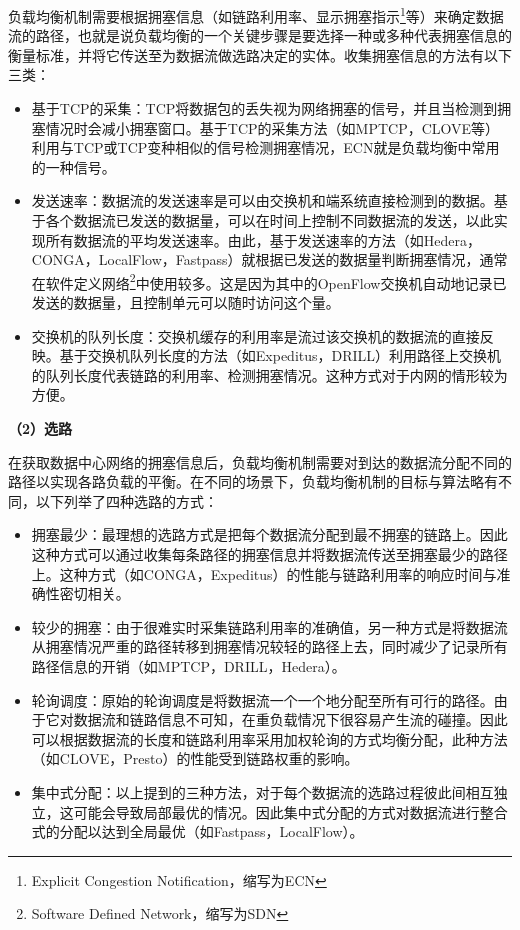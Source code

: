负载均衡机制需要根据拥塞信息（如链路利用率、显示拥塞指示\footnote{Explicit Congestion Notification，缩写为ECN}等）来确定数据流的路径，也就是说负载均衡的一个关键步骤是要选择一种或多种代表拥塞信息的衡量标准，并将它传送至为数据流做选路决定的实体。收集拥塞信息的方法有以下三类：
\begin{itemize}
    \item 基于TCP的采集：TCP将数据包的丢失视为网络拥塞的信号，并且当检测到拥塞情况时会减小拥塞窗口。基于TCP的采集方法（如MPTCP\cite{raiciu2011MPTCP}，CLOVE\cite{katta2016CLOVE}等）利用与TCP或TCP变种相似的信号检测拥塞情况，ECN就是负载均衡中常用的一种信号。
    \item 发送速率：数据流的发送速率是可以由交换机和端系统直接检测到的数据。基于各个数据流已发送的数据量，可以在时间上控制不同数据流的发送，以此实现所有数据流的平均发送速率。由此，基于发送速率的方法（如Hedera\cite{fares2010hedera}，CONGA\cite{alizadeh2014CONGA}，LocalFlow\cite{sen2013LocalFlow}，Fastpass\cite{perry2014Fastpass}）就根据已发送的数据量判断拥塞情况，通常在软件定义网络\footnote{Software Defined Network，缩写为SDN}中使用较多。这是因为其中的OpenFlow交换机自动地记录已发送的数据量，且控制单元可以随时访问这个量。
    \item 交换机的队列长度：交换机缓存的利用率是流过该交换机的数据流的直接反映。基于交换机队列长度的方法（如Expeditus\cite{wang2014Expeditus}，DRILL\cite{ghorbani2015drill}）利用路径上交换机的队列长度代表链路的利用率、检测拥塞情况。这种方式对于内网的情形较为方便。
\end{itemize}


\textbf{（2）选路}

在获取数据中心网络的拥塞信息后，负载均衡机制需要对到达的数据流分配不同的路径以实现各路负载的平衡。在不同的场景下，负载均衡机制的目标与算法略有不同，以下列举了四种选路的方式：
\begin{itemize}
    \item 拥塞最少：最理想的选路方式是把每个数据流分配到最不拥塞的链路上。因此这种方式可以通过收集每条路径的拥塞信息并将数据流传送至拥塞最少的路径上。这种方式（如CONGA\cite{alizadeh2014CONGA}，Expeditus\cite{wang2014Expeditus}）的性能与链路利用率的响应时间与准确性密切相关。
    \item 较少的拥塞：由于很难实时采集链路利用率的准确值，另一种方式是将数据流从拥塞情况严重的路径转移到拥塞情况较轻的路径上去，同时减少了记录所有路径信息的开销（如MPTCP\cite{raiciu2011MPTCP}，DRILL\cite{ghorbani2015drill}，Hedera\cite{fares2010hedera}）。
    \item 轮询调度：原始的轮询调度是将数据流一个一个地分配至所有可行的路径。由于它对数据流和链路信息不可知，在重负载情况下很容易产生流的碰撞。因此可以根据数据流的长度和链路利用率采用加权轮询的方式均衡分配，此种方法（如CLOVE\cite{katta2016CLOVE}，Presto\cite{he2014Presto}）的性能受到链路权重的影响。
    \item 集中式分配：以上提到的三种方法，对于每个数据流的选路过程彼此间相互独立，这可能会导致局部最优的情况。因此集中式分配的方式对数据流进行整合式的分配以达到全局最优（如Fastpass\cite{perry2014Fastpass}，LocalFlow\cite{sen2013LocalFlow}）。
\end{itemize}
